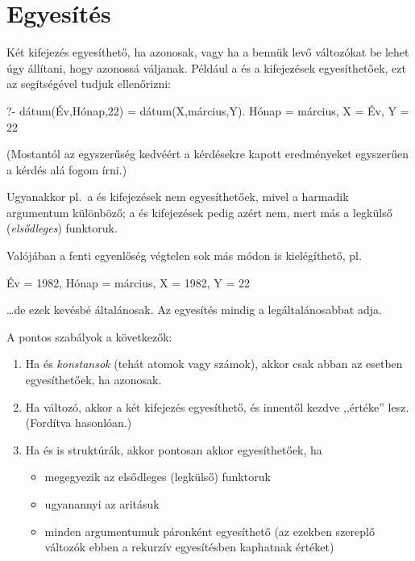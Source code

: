 \section{Egyesítés}
Két kifejezés egyesíthető, ha azonosak, vagy ha a
bennük levő változókat be lehet úgy állítani, hogy
azonossá váljanak. Például a 
és a  kifejezések
egyesíthetőek, ezt az \pr{=} segítségével tudjuk
ellenőrizni:
\begin{query}
?- dátum(Év,Hónap,22) = dátum(X,március,Y).
Hónap = március,
X = Év,
Y = 22
\end{query}
(Mostantól az egyszerűség kedvéért a kérdésekre
kapott eredményeket egyszerűen a kérdés alá fogom
írni.)

Ugyanakkor pl.~a  és
 kifejezések nem egyesíthetőek,
mivel a harmadik argumentum különböző; a
 és  kifejezések
pedig azért nem, mert más a legkülső
(\emph{elsődleges}) funktoruk.

Valójában a fenti egyenlőség végtelen sok más módon
is kielégíthető, pl.
\begin{query}
Év = 1982,
Hónap = március,
X = 1982,
Y = 22
\end{query}
\dots de ezek kevésbé általánosak. Az egyesítés
mindig a legáltalánosabbat adja.

A pontos szabályok a következők:
\begin{enumerate}
\item Ha  és  \emph{konstansok} (tehát
  atomok vagy számok), akkor csak abban az esetben
  egyesíthetőek, ha azonosak.
\item Ha  változó, akkor a két kifejezés
  egyesíthető, és innentől kezdve  ,,értéke''
   lesz. (Fordítva hasonlóan.)
\item Ha  és  is struktúrák, akkor pontosan akkor egyesíthetőek, ha
  \begin{itemize}
  \item megegyezik az elsődleges (legkülső) funktoruk
  \item ugyanannyi az aritásuk
  \item minden argumentumuk páronként egyesíthető
    (az ezekben szereplő változók ebben a rekurzív
    egyesítésben kaphatnak értéket)
  \end{itemize}
\end{enumerate}

